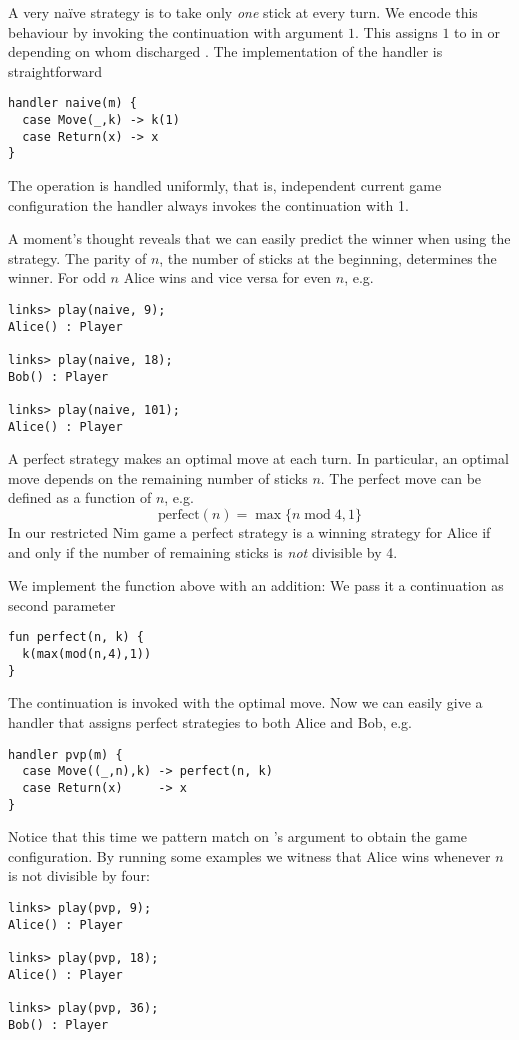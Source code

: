 \begin{example}\label{ex:nim-naive}
A very naïve strategy is to take only \emph{one} stick at every turn. We encode this behaviour by invoking the continuation with argument $1$. This assigns $1$ to  in  or  depending on whom discharged .
The implementation of the handler is straightforward
\begin{lstlisting}[style=links]
handler naive(m) {
  case Move(_,k) -> k(1)
  case Return(x) -> x
}
\end{lstlisting}
The operation  is handled uniformly, that is, independent current game configuration the handler always invokes the continuation  with 1.

A moment's thought reveals that we can easily predict the winner when using the  strategy. The parity of $n$, the number of sticks at the beginning, determines the winner. For odd $n$ Alice wins and vice versa for even $n$, e.g.
\begin{lstlisting}[style=links]
links> play(naive, 9);
Alice() : Player

links> play(naive, 18);
Bob() : Player

links> play(naive, 101);
Alice() : Player
\end{lstlisting} 
\end{example}

\begin{example}\label{ex:nim-perfect}
A perfect strategy makes an optimal move at each turn. In particular, an optimal move depends on the remaining number of sticks $n$. The perfect move can be defined as a function of $n$, e.g.
\[ \text{perfect}(n) = \max\{n\; \text{mod}\; 4, 1\} \]
In our restricted Nim game a perfect strategy is a winning strategy for Alice if and only if the number of remaining sticks is \emph{not} divisible by 4.

We implement the function  above with an addition: We pass it a continuation as second parameter
\begin{lstlisting}[style=links]
fun perfect(n, k) {
  k(max(mod(n,4),1))
}
\end{lstlisting}
The continuation is invoked with the optimal move. Now we can easily give a handler that assigns perfect strategies to both Alice and Bob, e.g.
\begin{lstlisting}[style=links]
handler pvp(m) {
  case Move((_,n),k) -> perfect(n, k)
  case Return(x)     -> x
}
\end{lstlisting}
Notice that this time we pattern match on 's argument to obtain the game configuration.
By running some examples we witness that Alice wins whenever $n$ is not divisible by four:
\begin{lstlisting}[style=links]
links> play(pvp, 9);
Alice() : Player

links> play(pvp, 18);
Alice() : Player

links> play(pvp, 36);
Bob() : Player
\end{lstlisting}
\end{example}

